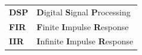\documentclass[
11pt, %
english, %
singlespacing, %
headsepline, %
]{MastersDoctoralThesis} %
\begin{document}
\tableofcontents %

\listoffigures %



%
\begin{longtable}{ll}
\textbf{DSP} & \textbf{D}igital \textbf{S}ignal \textbf{P}rocessing\\
\textbf{FIR} & \textbf{F}inite \textbf{I}mpulse \textbf{R}esponse\\
\textbf{IIR} & \textbf{I}nfinite \textbf{I}mpulse \textbf{R}esponse\\
\end{longtable}
\addtocounter{table}{-1} %








\mainmatter %

\pagestyle{thesis} %
\end{document}

